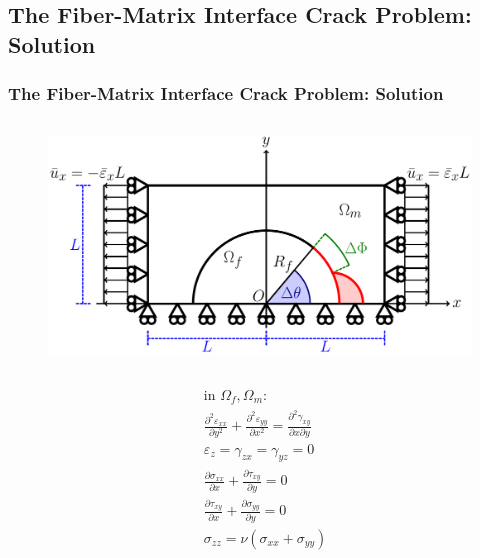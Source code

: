 \documentclass[first,firstsupp,lastsupp,last,hyperref,table]{ETHclass}
\begin{document}
\subsection[Solution]{The Fiber-Matrix Interface Crack Problem: Solution}

\begin{frame}
\frametitle{\vspace{0.3cm}\small The Fiber-Matrix Interface Crack Problem: Solution}
\vspace{-1.cm}
\centering
\begin{columns}
\begin{column}{0.6\textwidth}
\begin{figure}
\includegraphics[width=0.95\columnwidth]{RUC.pdf}
\end{figure}
\vspace{-0.75cm}
\begin{columns}
\begin{column}{0.4\columnwidth}
\tiny
\begin{equation*}
\begin{aligned}
&\text{in }\Omega_{f}, \Omega_{m}:\\
&\frac{\partial^{2}\varepsilon_{xx}}{\partial y^{2}}+\frac{\partial^{2}\varepsilon_{yy}}{\partial x^{2}}=\frac{\partial^{2}\gamma_{xy}}{\partial x\partial y}\\
&\varepsilon_{z}=\gamma_{zx}=\gamma_{yz}=0\\
&\frac{\partial\sigma_{xx}}{\partial x}+\frac{\partial\tau_{xy}}{\partial y} = 0\\
&\frac{\partial\tau_{xy}}{\partial x}+\frac{\partial\sigma_{yy}}{\partial y} = 0\\
&\sigma_{zz}=\nu\left(\sigma_{xx}+\sigma_{yy}\right)\\
\end{aligned}
\end{equation*}
\end{column}

\end{columns}
\end{column}
\end{columns}
\end{frame}
\end{document}
